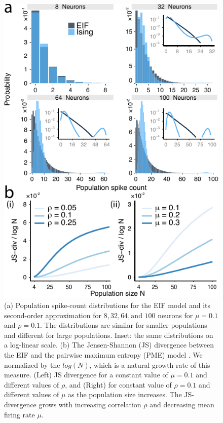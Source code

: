 \documentclass[%
 reprint,
 twocolumn,
 amsmath,amssymb,
 aps,
floatfix,
]{revtex4}
\begin{document}
\begin{figure}[h]
\includegraphics{figures/fig_2a_test.pdf}
\caption{\label{fig:eifising} %
(a) Population spike-count distributions for the EIF model and its second-order approximation for $8, 32, 64, \text{and } 100$ neurons for $\mu = 0.1$ and $\rho = 0.1$. The distributions are similar for smaller populations and different for large populations. Inset: the same distributions on a log-linear scale. (b) The Jensen-Shannon (JS) divergence between the EIF and the pairwise maximum entropy (PME) model .  We normalized by the $log(N)$, which is a natural growth rate of this measure. (Left) JS divergence for a constant value of $\mu = 0.1$ and different values of $\rho$, and (Right) for constant value of $\rho = 0.1$ and different values of $\mu$ as the population size increases. The JS-divergence grows with increasing correlation $\rho$ and decreasing mean firing rate $\mu$.}
\end{figure}
\end{document}
